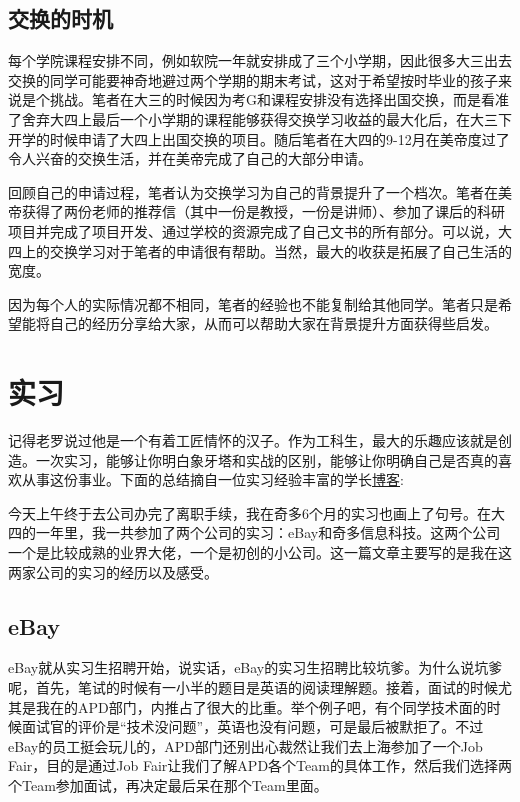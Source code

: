 \subsection{交换的时机}
每个学院课程安排不同，例如软院一年就安排成了三个小学期，因此很多大三出去交换的同学可能要神奇地避过两个学期的期末考试，这对于希望按时毕业的孩子来说是个挑战。笔者在大三的时候因为考G和课程安排没有选择出国交换，而是看准了舍弃大四上最后一个小学期的课程能够获得交换学习收益的最大化后，在大三下开学的时候申请了大四上出国交换的项目。随后笔者在大四的9-12月在美帝度过了令人兴奋的交换生活，并在美帝完成了自己的大部分申请。\par
回顾自己的申请过程，笔者认为交换学习为自己的背景提升了一个档次。笔者在美帝获得了两份老师的推荐信（其中一份是教授，一份是讲师）、参加了课后的科研项目并完成了项目开发、通过学校的资源完成了自己文书的所有部分。可以说，大四上的交换学习对于笔者的申请很有帮助。当然，最大的收获是拓展了自己生活的宽度。\par
因为每个人的实际情况都不相同，笔者的经验也不能复制给其他同学。笔者只是希望能将自己的经历分享给大家，从而可以帮助大家在背景提升方面获得些启发。

\section{实习}
记得老罗说过他是一个有着工匠情怀的汉子。作为工科生，最大的乐趣应该就是创造。一次实习，能够让你明白象牙塔和实战的区别，能够让你明确自己是否真的喜欢从事这份事业。下面的总结摘自一位实习经验丰富的学长\href{http://blog.sheimi.me/blog/2013/06/17/my-internship.html}{博客}:\par
今天上午终于去公司办完了离职手续，我在奇多6个月的实习也画上了句号。在大四的一年里，我一共参加了两个公司的实习：eBay和奇多信息科技。这两个公司一个是比较成熟的业界大佬，一个是初创的小公司。这一篇文章主要写的是我在这两家公司的实习的经历以及感受。
\subsection{eBay}
eBay就从实习生招聘开始，说实话，eBay的实习生招聘比较坑爹。为什么说坑爹呢，首先，笔试的时候有一小半的题目是英语的阅读理解题。接着，面试的时候尤其是我在的APD部门，内推占了很大的比重。举个例子吧，有个同学技术面的时候面试官的评价是“技术没问题”，英语也没有问题，可是最后被默拒了。不过eBay的员工挺会玩儿的，APD部门还别出心裁然让我们去上海参加了一个Job Fair，目的是通过Job Fair让我们了解APD各个Team的具体工作，然后我们选择两个Team参加面试，再决定最后呆在那个Team里面。\par

